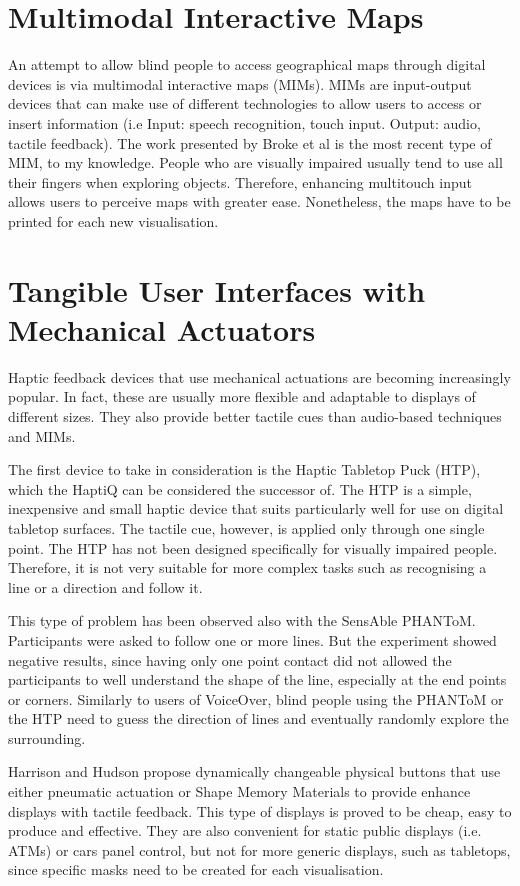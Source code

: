 \section{Multimodal Interactive Maps}
An attempt to allow blind people to access geographical maps through digital devices is via multimodal interactive maps (MIMs). MIMs are input-output devices that can make use of different technologies to allow users to access or insert information (i.e Input: speech recognition, touch input. Output: audio, tactile feedback). The work presented by Broke et al \cite{brock2010usage} is the most recent type of MIM, to my knowledge. People who are visually impaired usually tend to use all their fingers when exploring objects. Therefore, enhancing multitouch input allows users to perceive maps with greater ease. Nonetheless, the maps have to be printed for each new visualisation. 

\section{Tangible User Interfaces with Mechanical Actuators}
Haptic feedback devices that use mechanical actuations are becoming increasingly popular. In fact, these are usually more flexible and adaptable to displays of different sizes. They also provide better tactile cues than audio-based techniques and MIMs.

The first device to take in consideration is the Haptic Tabletop Puck (HTP)\cite{marquardt2009haptic}, which the HaptiQ can be considered the successor of. The HTP is a simple, inexpensive and small haptic device that suits particularly well for use on digital tabletop surfaces. The tactile cue, however, is applied only through one single point. The HTP has not been designed specifically for visually impaired people. Therefore, it is not very suitable for more complex tasks such as recognising a line or a direction and follow it. 

This type of problem has been observed also with the SensAble PHANToM\cite{massie1994phantom, yu2001haptic}. Participants were asked to follow one or more lines. But the experiment showed negative results, since having only one point contact did not allowed the participants to well understand the shape of the line, especially at the end points or corners. Similarly to users of VoiceOver, blind people using the PHANToM or the HTP need to guess the direction of lines and eventually randomly explore the surrounding. 

Harrison and Hudson \cite{harrison2009providing} propose dynamically changeable physical buttons that use either pneumatic actuation or Shape Memory Materials to provide enhance displays with tactile feedback. This type of displays is proved to be cheap, easy to produce and effective. They are also convenient for static public displays (i.e. ATMs) or cars panel control, but not for more generic displays, such as tabletops, since specific masks need to be created for each visualisation. 

